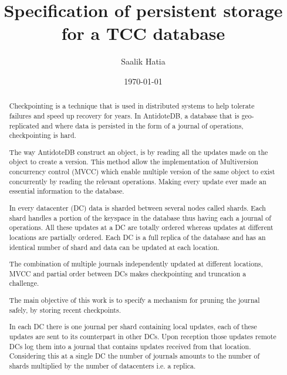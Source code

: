 \documentclass[11pt]{article}
\begin{document}
\author{Saalik Hatia}
\title{Specification of persistent storage for a TCC database}
\date\today
\maketitle

\begin{abstract}

  
  Checkpointing is a technique that is used in distributed 
  systems to help tolerate failures and speed up recovery for years.
  In AntidoteDB, a database that is geo-replicated and where data is 
  persisted in the form of a journal of operations, checkpointing is hard.

  The way AntidoteDB construct an object, is by reading all the updates 
  made on the object to create a version.
  This method allow the implementation of Multiversion concurrency
  control (MVCC) which enable multiple version of the same object to exist
  concurrently by reading the relevant operations.
  Making every update ever made an essential information to the database.

  In every datacenter (DC) data is sharded between several nodes called shards.
  Each shard handles a portion of the keyspace in the database thus having 
  each a journal of operations.
  All these updates at a DC are totally ordered whereas 
  updates at different locations are partially ordered. 
  Each DC is a full replica of the database and has an identical number of 
  shard and data can be updated at each location.

  The combination of multiple journals independently updated at different 
  locations, MVCC and partial order between DCs makes checkpointing and 
  truncation a challenge.

  The main objective of this work is to specify a mechanism for
  pruning the journal safely, by storing recent checkpoints.

  In each DC there is one journal per shard containing local updates, 
  each of these updates are sent to its counterpart in other DCs.
  Upon reception those updates remote DCs log them into a journal that 
  contains updates received from that location.
  Considering this at a single DC the number of journals amounts to the
  number of shards multiplied by the number of datacenters i.e. a replica.
  

\end{abstract}
\end{document}
